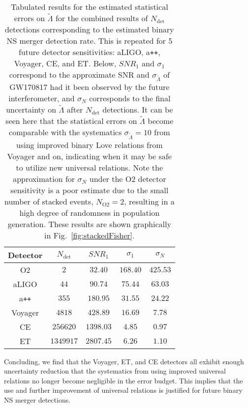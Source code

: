 \documentclass[prd,twocolumn,nofootinbib,superscriptaddress,amsmath,amssymb]{revtex4-1}
\begin{document}
\begin{table}[ht!]
\centering
\caption{
Tabulated results for the estimated statistical errors on $\tilde{\Lambda}$ for the combined results of $N_{\text{det}}$ detections corresponding to the estimated binary NS merger detection rate.
This is repeated for 5 future detector sensitivities: aLIGO, a\texttt{++}, Voyager, CE, and ET.
Below, $SNR_1$ and $\sigma_1$ correspond to the approximate SNR and $\sigma_{\tilde{\Lambda}}$ of GW170817 had it been observed by the future interferometer, and $\sigma_N$ corresponds to the final uncertainty on $\tilde{\Lambda}$ after $N_{\text{det}}$ detections.
It can be seen here that the statistical errors on $\tilde{\Lambda}$ become comparable with the systematics $\sigma_{\tilde{\Lambda}}=10$ from using improved binary Love relations from Voyager and on, indicating when it may be safe to utilize new universal relations.
Note the approximation for $\sigma_N$ under the O2 detector sensitivity is a poor estimate due to the small number of stacked events, $N_{\text{O2}}=2$, resulting in a high degree of randomness in population generation.
These results are shown graphically in Fig.~\ref{fig:stackedFisher}.
}\label{tab:variances}
\begin{tabular}{ c || c  c  c c } 
\hline
Detector & $N_{\text{det}}$ & $SNR_1$ & $\sigma_1$ & $\sigma_N$\\
\hline
\hline
O2 & $2$ & $32.40$ & $168.40$ & $425.53$\\
aLIGO & $44$ & $90.74$ & $75.44$ & $63.03$\\
a\texttt{++} & $355$ & $180.95$ & $31.55$ & $24.22$\\
Voyager & $4818$ & $428.89$ & $16.69$ & $7.78$\\
CE & $256620$ & $1398.03$ & $4.85$ & $0.97$\\
ET & $1349917$ & $2807.45$ & $6.26$ & $1.10$\\
\hline
\end{tabular}
\end{table}

Concluding, we find that the Voyager, ET, and CE detectors all exhibit enough uncertainty reduction that the systematics from using improved universal relations no longer become negligible in the error budget.
This implies that the use and further improvement of universal relations is justified for future binary NS merger detections.

\end{document}
